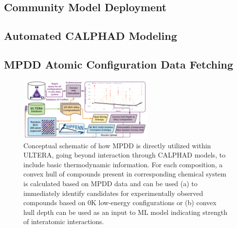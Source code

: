 \subsection{Community Model Deployment} \label{ultera:ssec:communitymodels}

\todo




\subsection{Automated CALPHAD Modeling} \label{ultera:ssec:autocalphad}

\todo






\subsection{MPDD Atomic Configuration Data Fetching} \label{ultera:ssec:mpdd}

\todo

\begin{figure}[H]
    \centering
    \includegraphics[width=0.6\textwidth]{ultera/ULTERA_BasicThermodynamics_V1.png}
    \caption{Conceptual schematic of how MPDD is directly utilized within ULTERA, going beyond interaction through CALPHAD models, to include basic thermodynamic information. For each composition, a convex hull of compounds present in corresponding chemical system is calculated based on MPDD data and can be used (a) to immediately identify candidates for experimentally observed compounds based on 0K low-energy configurations or (b) convex hull depth can be used as an input to ML model indicating strength of interatomic interactions.}
    \label{ultera:fig:mpdd}
\end{figure}








\printbibliography[heading=subbibintoc]